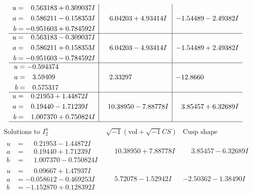 \documentclass[1p]{elsarticle_modified}
\theoremstyle{definition}
\newcommand{\I}{\sqrt{-1}}
\begin{document}
$$\begin{array}{c|c|c}
\begin{aligned}
u &= \phantom{-}0.563183 + 0.309037 I \\
a &= \phantom{-}0.586211 - 0.158353 I \\
b &= -0.951603 + 0.784592 I\end{aligned}
 & \phantom{-}6.04203 + 4.93414 I & -1.54489 - 2.49382 I \\ \hline\begin{aligned}
u &= \phantom{-}0.563183 - 0.309037 I \\
a &= \phantom{-}0.586211 + 0.158353 I \\
b &= -0.951603 - 0.784592 I\end{aligned}
 & \phantom{-}6.04203 - 4.93414 I & -1.54489 + 2.49382 I \\ \hline\begin{aligned}
u &= -0.594374\phantom{ +0.000000I} \\
a &= \phantom{-}3.59409\phantom{ +0.000000I} \\
b &= \phantom{-}0.575317\phantom{ +0.000000I}\end{aligned}
 & \phantom{-}2.33297\phantom{ +0.000000I} & -12.8660\phantom{ +0.000000I} \\ \hline\begin{aligned}
u &= \phantom{-}0.21953 + 1.44872 I \\
a &= \phantom{-}0.19440 - 1.71239 I \\
b &= \phantom{-}1.007370 + 0.750824 I\end{aligned}
 & \phantom{-}10.38950 - 7.88778 I & \phantom{-}3.85457 + 6.32689 I\\
 \hline 
 \end{array}$$\newpage$$\begin{array}{c|c|c}  
\text{Solutions to }I^u_{2}& \I (\text{vol} + \sqrt{-1}CS) & \text{Cusp shape}\\
 \hline 
\begin{aligned}
u &= \phantom{-}0.21953 - 1.44872 I \\
a &= \phantom{-}0.19440 + 1.71239 I \\
b &= \phantom{-}1.007370 - 0.750824 I\end{aligned}
 & \phantom{-}10.38950 + 7.88778 I & \phantom{-}3.85457 - 6.32689 I \\ \hline\begin{aligned}
u &= \phantom{-}0.09667 + 1.47937 I \\
a &= -0.058612 - 0.469253 I \\
b &= -1.152870 + 0.128392 I\end{aligned}
 & \phantom{-}5.72078 - 1.52942 I & -2.50362 - 1.38490 I \\ \hline\begin{aligned}

\end{aligned}
\end{array}$$
\end{document}
